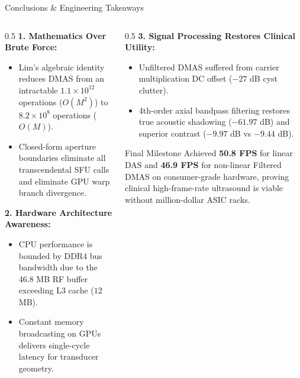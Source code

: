 \documentclass[aspectratio=169,10pt]{beamer}
\begin{document}
\begin{frame}{Conclusions \& Engineering Takeaways}
  \begin{columns}[T]
    \begin{column}{0.5\textwidth}
      \textbf{1. Mathematics Over Brute Force:}
      \scriptsize
      \begin{itemize}
        \item Lim's algebraic identity reduces DMAS from an intractable $1.1\times 10^{12}$ operations ($O(M^2)$) to $8.2\times 10^8$ operations ($O(M)$).
        \item Closed-form aperture boundaries eliminate all transcendental SFU calls and eliminate GPU warp branch divergence.
      \end{itemize}
      \vspace{0.2cm}
      \textbf{2. Hardware Architecture Awareness:}
      \scriptsize
      \begin{itemize}
        \item CPU performance is bounded by DDR4 bus bandwidth due to the 46.8 MB RF buffer exceeding L3 cache ($12$ MB).
        \item Constant memory broadcasting on GPUs delivers single-cycle latency for transducer geometry.
      \end{itemize}
    \end{column}
    \begin{column}{0.5\textwidth}
      \textbf{3. Signal Processing Restores Clinical Utility:}
      \scriptsize
      \begin{itemize}
        \item Unfiltered DMAS suffered from carrier multiplication DC offset ($-27$ dB cyst clutter).
        \item 4th-order axial bandpass filtering restores true acoustic shadowing ($-61.97$ dB) and superior contrast ($-9.97$ dB vs $-9.44$ dB).
      \end{itemize}
      \vspace{0.2cm}
      \begin{alertblock}{Final Milestone}
        \scriptsize
        Achieved \textbf{50.8 FPS} for linear DAS and \textbf{46.9 FPS} for non-linear Filtered DMAS on consumer-grade hardware, proving clinical high-frame-rate ultrasound is viable without million-dollar ASIC racks.
      \end{alertblock}
    \end{column}
  \end{columns}
\end{frame}
\end{document}

